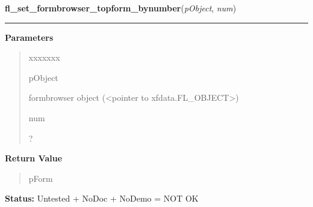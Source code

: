 \hspace{.8\funcindent}\begin{boxedminipage}{\funcwidth}

    \raggedright \textbf{fl\_set\_formbrowser\_topform\_bynumber}(\textit{pObject}, \textit{num})

    \vspace{-1.5ex}

    \rule{\textwidth}{0.5\fboxrule}
\setlength{\parskip}{2ex}
\setlength{\parskip}{1ex}
      \textbf{Parameters}
      \vspace{-1ex}

      \begin{quote}
        \begin{Ventry}{xxxxxxx}

          \item[pObject]

          formbrowser object ({\textless}pointer to 
          xfdata.FL\_OBJECT{\textgreater})

          \item[num]

          ?

        \end{Ventry}

      \end{quote}

      \textbf{Return Value}
    \vspace{-1ex}

      \begin{quote}
      pForm

      \end{quote}

\textbf{Status:} Untested + NoDoc + NoDemo = NOT OK



    \end{boxedminipage}

    \label{xformslib:library:fl_set_formbrowser_xoffset}

    \vspace{0.5ex}

